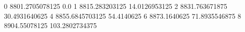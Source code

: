 0 8801.2705078125 0.0
1 8815.283203125 14.0126953125
2 8831.763671875 30.4931640625
4 8855.6845703125 54.4140625
6 8873.1640625 71.8935546875
8 8904.55078125 103.2802734375
